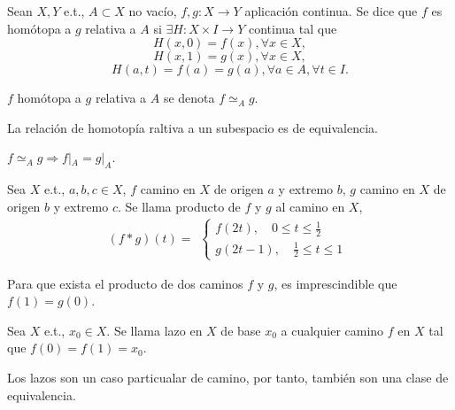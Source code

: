 \begin{defn}
  Sean $X, Y$ e.t., $A \subset X$ no vacío, $f,g : X \to Y$ aplicación continua. Se dice que $f$ es homótopa a $g$ relativa a $A$ si $\exists H : X \times I \to Y$ continua tal que
  \[ 
    H(x,0) = f(x), \forall x \in X,
  \] 
  \[ 
    H(x,1) = g(x), \forall x \in X,
  \] 
  \[ 
    H(a,t) = f(a) = g(a), \forall a \in A, \forall t \in I.
  \] 
\end{defn}

\begin{nota}
  $f$ homótopa a $g$ relativa a $A$ se denota $f \simeq_{A} g$.
\end{nota}

\begin{obs}
  La relación de homotopía raltiva a un subespacio es de equivalencia.
\end{obs}

\begin{obs}
  $f \simeq_{A} g \Rightarrow f|_{A} = g|_{A}$.
\end{obs}

\begin{defn}[Producto]
  Sea $X$ e.t., $a, b, c \in X$, $f$ camino en $X$ de origen $a$ y extremo $b$, $g$ camino en $X$ de origen $b$ y extremo $c$. Se llama producto de $f$ y $g$ al camino en $X$,
  \[ 
    (f * g)(t) =
    \begin{aligned}
      \begin{cases}
        f(2t), \quad 0 \leq t \leq \frac{1}{2} \\
        g(2t - 1), \quad \frac{1}{2} \leq t \leq 1
      \end{cases}
    \end{aligned} 
  \] 
\end{defn}

\begin{obs}
  Para que exista el producto de dos caminos $f$ y $g$, es imprescindible que $f(1) = g(0)$.
\end{obs}

\begin{defn}[Lazo]
  Sea $X$ e.t., $x_{0} \in X$. Se llama lazo en $X$ de base $x_{0}$ a cualquier camino $f$ en $X$ tal que $f(0) = f(1) = x_{0}$.
\end{defn}

\begin{obs}
  Los lazos son un caso particualar de camino, por tanto, también son una clase de equivalencia.
\end{obs}

